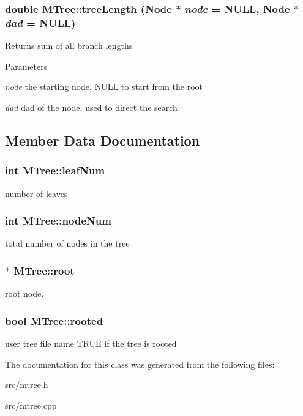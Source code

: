 \hypertarget{classMTree_a82b21a2f17affae4922b690ea6d2837b}{
\subsubsection[{treeLength}]{\setlength{\rightskip}{0pt plus 5cm}double MTree::treeLength ({\bf Node} $\ast$ {\em node} = {\ttfamily NULL}, \/  {\bf Node} $\ast$ {\em dad} = {\ttfamily NULL})}}
\label{classMTree_a82b21a2f17affae4922b690ea6d2837b}
\begin{DoxyReturn}{Returns}
sum of all branch lengths 
\end{DoxyReturn}

\begin{DoxyParams}{Parameters}
\item[{\em node}]the starting node, NULL to start from the root \item[{\em dad}]dad of the node, used to direct the search \end{DoxyParams}


\subsection{Member Data Documentation}
\hypertarget{classMTree_a8fe3d41dd96bf4507c60f2c73dcb1026}{
\subsubsection[{leafNum}]{\setlength{\rightskip}{0pt plus 5cm}int {\bf MTree::leafNum}}}
\label{classMTree_a8fe3d41dd96bf4507c60f2c73dcb1026}
number of leaves \hypertarget{classMTree_a1b8904ca0e0218081a92233cbe21478c}{
\subsubsection[{nodeNum}]{\setlength{\rightskip}{0pt plus 5cm}int {\bf MTree::nodeNum}}}
\label{classMTree_a1b8904ca0e0218081a92233cbe21478c}
total number of nodes in the tree \hypertarget{classMTree_af29314a803a9e49bdddd4f5e374bd35e}{
\subsubsection[{root}]{$\ast$ {\bf MTree::root}}}
\label{classMTree_af29314a803a9e49bdddd4f5e374bd35e}
root node. \hypertarget{classMTree_ae9131924ff162d9cda80333b6f6242b4}{
\subsubsection[{rooted}]{\setlength{\rightskip}{0pt plus 5cm}bool {\bf MTree::rooted}}}
\label{classMTree_ae9131924ff162d9cda80333b6f6242b4}
user tree file name TRUE if the tree is rooted 

The documentation for this class was generated from the following files:\begin{DoxyCompactItemize}
\item 
src/mtree.h\item 
src/mtree.cpp\end{DoxyCompactItemize}
